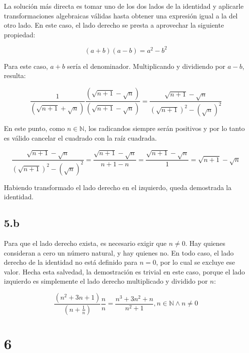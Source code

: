 \documentclass{article}
\begin{document}
La solución más directa es tomar uno de los dos lados de la identidad y aplicarle transformaciones algebraicas válidas hasta obtener una expresión igual a la del otro lado. En este caso, el lado derecho se presta a aprovechar la siguiente propiedad:

\begin{equation}
(a + b)(a - b) = a^2 - b^2
\end{equation}

Para este caso, $a + b$ sería el denominador. Multiplicando y dividiendo por $a - b$, resulta:

\begin{equation}
\frac{1}{(\sqrt{n + 1}+\sqrt{n})} \frac{(\sqrt{n+1}-\sqrt{n})}{(\sqrt{n+1}-\sqrt{n})} = \frac{\sqrt{n+1}-\sqrt{n}}{(\sqrt{n+1})^2 -(\sqrt{n})^2 }
\end{equation}

En este punto, como $n \in \mathbb{N}$, los radicandos siempre serán positivos y por lo tanto es válido cancelar el cuadrado con la raíz cuadrada. 

\begin{equation}
\frac{\sqrt{n+1}-\sqrt{n}}{(\sqrt{n+1})^2 -(\sqrt{n})^2 } = \frac{\sqrt{n+1}-\sqrt{n}}{n+1-n} = \frac{\sqrt{n+1}-\sqrt{n}}{1} = \sqrt{n+1}-\sqrt{n}
\end{equation}

Habiendo transformado el lado derecho en el izquierdo, queda demostrada la identidad.

\subsection*{5.b}
\label{subsec:5.b}

Para que el lado derecho exista, es necesario exigir que $n \neq 0$. Hay quienes consideran a cero un número natural, y hay quienes no. En todo caso, el lado derecho de la identidad no está definido para $n = 0$, por lo cual se excluye ese valor. Hecha esta salvedad, la demostración es trivial en este caso, porque el lado izquierdo es simplemente el lado derecho multiplicado y dividido por $n$:

\begin{equation}
\frac{(n^2 + 3n + 1)}{(n + \frac{1}{n})} \frac{n}{n} = \frac{n^3 + 3n^2 + n}{n^2 + 1}, n \in \mathbb{N} \wedge n \neq 0
\end{equation}

\section*{6}
\label{sec:6}
\end{document}
